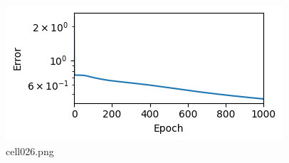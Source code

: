 \begin{figure}[ht]
	\centering
	\includegraphics[scale=0.8, max width=\linewidth]{./fig/solve-credit-assignment-problem/backpropagation/cell026.png}
	\caption{cell026.png}
	\label{cell026.png}
\end{figure}